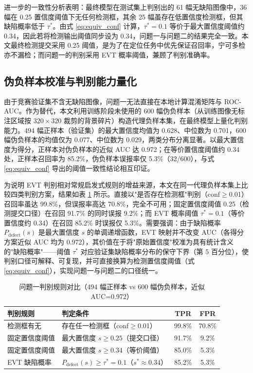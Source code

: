 进一步的一致性分析表明：最终模型在测试集上判别出的 61 幅无缺陷图像中，36 幅在 0.25 置信度阈值下无任何检测框，其余 25 幅虽存在低置信度检测框，但其缺陷概率低于 $\tau^{*}$。由式 \eqref{eq:equiv_conf} 计算，$\tau^{*}=0.1$ 等价于最大置信度阈值约 0.34，因此若将检测输出阈值同步设为 0.34，问题一与问题二的结果完全一致。本文最终检测提交采用 0.25 阈值，是为了在定位任务中优先保证召回率，宁可多检亦不漏检；而问题一的判别采用 EVT 概率阈值，兼顾了判别准确率。

\subsection{伪负样本校准与判别能力量化}

由于竞赛验证集不含无缺陷图像，问题一无法直接在本地计算混淆矩阵与 ROC-AUC。作为替代，本文利用训练阶段未使用的 600 幅伪负样本（从训练图像无标注区域按 $320\times320$ 裁剪的背景碎片）构造代理负样本集，在最终模型上量化判别能力。494 幅正样本（验证集）的最大置信度均值为 0.628、中位数为 0.701，600 幅伪负样本的均值仅为 0.077、中位数为 0.029，两类分布分离显著。以最大置信度为得分，正样本对伪负样本的近似 AUC 达 0.972；在等价置信度阈值约 0.34 处，正样本召回率为 85.2\%，伪负样本误报率仅 5.3\%（32/600），与式 \eqref{eq:equiv_conf} 导出的阈值一致性结论相互印证。

为说明 EVT 判别相对常规启发式规则的增益来源，本文在同一代理负样本集上比较四类判别方案，结果如表 \ref{tab:evt_compare} 所示。直接以"是否存在检测框"判别（conf$\ge$0.01）召回率虽达 99.8\%，但误报率高达 70.8\%，完全不可用；固定置信度阈值 0.25（检测提交口径）在召回 91.7\% 的同时误报 9.2\%；而 EVT 概率阈值 $\tau^{*}=0.1$（等价置信度约 0.34）在召回 85.2\% 时误报仅 5.3\%。需要强调：由于缺陷概率 $P_{\mathrm{defect}}(s)$ 是最大置信度 $s$ 的单调递增函数，EVT 映射并不改变 AUC（各得分方案近似 AUC 均为 0.972），其价值在于将"原始置信度"校准为具有统计含义的"缺陷概率"——阈值 $\tau^{*}$ 对应验证集缺陷概率分布的保守下界（第 5 百分位），使判别口径可解释、可复现，并可直接换算为检测置信度阈值（式 \eqref{eq:equiv_conf}），实现问题一与问题二的口径统一。

\begin{table}[H]
\centering
{}
\caption{问题一判别规则对比（494 幅正样本 vs 600 幅伪负样本，近似 AUC=0.972）}\label{tab:evt_compare}
\begin{tabular}{llcc}
  \toprule
  判别规则 & 判定条件 & TPR & FPR \\
  \midrule
  检测框有无 & 存在任一检测框（conf$\ge$0.01） & 99.8\% & 70.8\% \\
  固定置信度阈值 & 最大置信度 $s\ge 0.25$（提交口径） & 91.7\% & 9.2\% \\
  固定置信度阈值 & 最大置信度 $s\ge 0.34$（等价阈值） & 85.0\% & 5.3\% \\
  EVT 缺陷概率 & $P_{\mathrm{defect}}(s)\ge\tau^{*}=0.1$（$s^{*}\approx0.34$） & 85.2\% & 5.3\% \\
  \bottomrule
\end{tabular}
\end{table}

